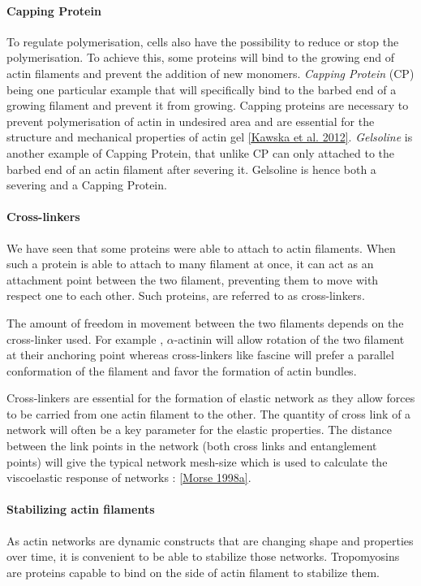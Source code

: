 \documentclass[A4paperpaper,11pt,english]{sphinxmanual}
\begin{document}
\paragraph{Capping Protein}
\label{index-latex:capping-protein}
To regulate polymerisation, cells also have the possibility to reduce or stop
the polymerisation. To achieve this, some proteins will bind to the growing end
of actin filaments and prevent the addition of new monomers.  \emph{Capping Protein}
(CP) being one particular example that will specifically bind to the barbed end
of a growing filament and  prevent it from growing. Capping proteins are
necessary to prevent polymerisation of actin in undesired area
and are essential for the structure and mechanical properties of actin gel
{\hyperref[index-latex:kawska2012]{{[}Kawska et al. 2012{]}}}. \emph{Gelsoline} is another example of Capping Protein, that
unlike CP can only attached to the barbed end of an actin filament after
severing it. Gelsoline is hence both a severing and a Capping Protein.


\paragraph{Cross-linkers}
\label{index-latex:cross-linkers}
We have seen that some proteins were able to attach to actin filaments. When
such a protein is able to attach to many filament at once, it can act as an
attachment point between the two filament, preventing them to move with respect
one to each other. Such proteins, are referred to as cross-linkers.

The amount of freedom in movement between the two filaments depends on the
cross-linker used. For example , \(\alpha\)-actinin will allow rotation of the two
filament at their anchoring point whereas cross-linkers like fascine will prefer
a parallel conformation of the filament and favor the formation of actin
bundles.

Cross-linkers are essential for the formation of elastic network as they allow
forces to be carried from one actin filament to the other. The quantity of
cross link of a network will often be a key parameter for the elastic properties.
The distance between the link points in the network (both cross links
and entanglement points) will give the typical network mesh-size which is used
to calculate the viscoelastic response of networks : {\hyperref[index-latex:morse1998a]{{[}Morse  1998a{]}}}.


\paragraph{Stabilizing actin filaments}
\label{index-latex:stabilizing-actin-filaments}
As actin networks are dynamic constructs that are changing shape and properties
over time, it is convenient to be able to stabilize those networks. Tropomyosins
are proteins capable to bind on the side of actin filament to stabilize them.
\end{document}
